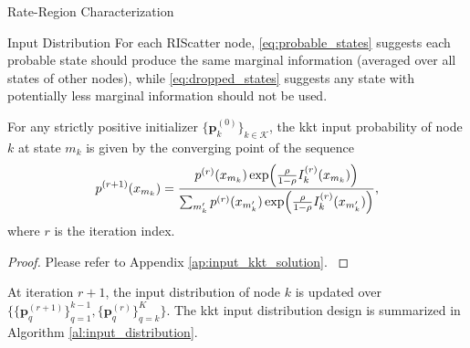 \begin{section}{Rate-Region Characterization}
\begin{subsection}{Input Distribution}
		For each RIScatter node, \eqref{eq:probable_states} suggests each probable state should produce the same marginal information (averaged over all states of other nodes), while \eqref{eq:dropped_states} suggests any state with potentially less marginal information should not be used.
		\begin{proposition}
			For any strictly positive initializer $\{\boldsymbol{p}_k^{(0)}\}_{k \in \mathcal{K}}$, the \gls{kkt} input probability of node $k$ at state $m_k$ is given by the converging point of the sequence
			\begin{equation}
				p^{(r+1)}(x_{m_k}) = \frac{p^{(r)}(x_{m_k}) \exp \Bigl( \frac{\rho}{1 - \rho} I_k^{(r)}(x_{m_k}) \Bigr)}{\sum_{m_k'} p^{(r)}(x_{m_k'}) \exp \Bigl( \frac{\rho}{1 - \rho} I_k^{(r)}(x_{m_k'}) \Bigr)},
				\label{eq:input_kkt_solution}
			\end{equation}
			where $r$ is the iteration index.
			\label{pr:input_kkt_solution}
		\end{proposition}
		\begin{proof}
			Please refer to Appendix \ref{ap:input_kkt_solution}.
			\label{pf:input_kkt_solution}
		\end{proof}

		At iteration $r+1$, the input distribution of node $k$ is updated over $\bigl\{\{\boldsymbol{p}_q^{(r+1)}\}_{q=1}^{k-1},\{\boldsymbol{p}_q^{(r)}\}_{q=k}^{K}\bigr\}$.
		The \gls{kkt} input distribution design is summarized in Algorithm \ref{al:input_distribution}.


\end{subsection}
\end{section}
